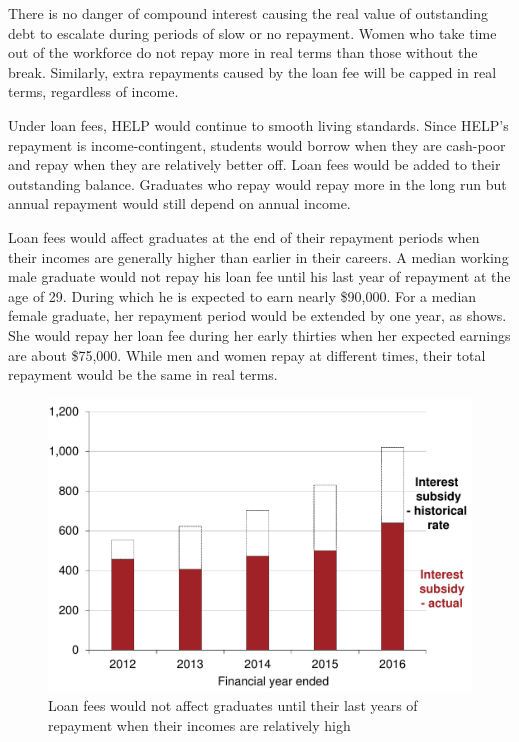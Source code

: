 \documentclass[embargoed]{grattan}
\begin{document}
{There is no danger of compound interest causing the real value of outstanding debt to escalate during periods of slow or no repayment.
Women who take time out of the workforce do not repay more in real terms than those without the break.
Similarly, extra repayments caused by the loan fee will be capped in real terms, regardless of income.

Under loan fees, \gls{HELP} would continue to smooth living standards.
Since \gls{HELP}'s repayment is income-contingent, students would borrow when they are cash-poor and repay when they are relatively better off.
Loan fees would be added to their outstanding balance.
Graduates who repay would repay more in the long run but annual repayment would still depend on annual income.

Loan fees would affect graduates at the end of their repayment periods when their incomes are generally higher than earlier in their careers.
A median working male graduate would not repay his loan fee until his last year of repayment at the age of 29.
During which he is expected to earn nearly \$90,000.
For a median female graduate, her repayment period would be extended by one year, as  shows.
She would repay her loan fee during her early thirties when her expected earnings are about \$75,000.
While men and women repay at different times, their total repayment would be the same in real terms.

\begin{figure}
\caption{Loan fees would not affect graduates until their last years of repayment when their incomes are relatively high}\label{fig:fig21-loan-fees-would-not-affect-grads-until-their-last-years-of-repayment-when-their-incomes-are-relatively-high}


\includegraphics[page=21]{atlas/Chartpack.pdf}


\end{figure}}
\end{document}
